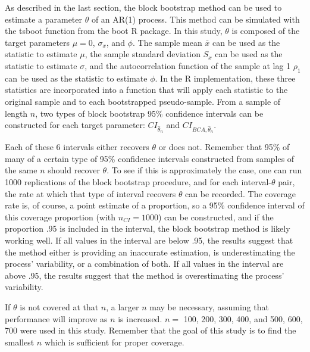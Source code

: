 \documentclass[12pt, letterpaper, titlepage]{article}
\begin{document}
As described in the last section, the block bootstrap method can be used to
estimate a parameter $\theta$ of an AR(1) process. This method can be
simulated with the tsboot function from the boot R package. In this study,
$\theta$ is composed of the target parameters $\mu = 0$, $\sigma_{x}$, and
$\phi$. The sample mean $\bar{x}$ can be used as the statistic to estimate
$\mu$, the sample standard deviation $S_x$ can be used as the statistic to
estimate $\sigma$, and the autocorrelation function of the sample at lag 1
$\rho_1$ can be used as the statistic to estimate $\phi$. In the R
implementation, these three statistics are incorporated into a function that
will apply each statistic to the original sample and to each bootstrapped
pseudo-sample. From a sample of length $n$, two types of block bootstrap 95\%
confidence intervals can be constructed for each target parameter:
$CI_{\hat{\theta}_{n}}$ and $CI_{BCA, \hat{\theta}_{n}}$.


Each of these 6 intervals either recovers $\theta$ or does not. Remember that
95\% of many of a certain type of 95\% confidence intervals constructed from
samples of the same $n$ should recover $\theta$. To see if this is
approximately the case, one can run 1000 replications of the block bootstrap
procedure, and for each interval-$\theta$ pair, the rate at which that type of
interval recovers $\theta$ can be recorded. The coverage rate is, of course, a
point estimate of a proportion, so a 95\% confidence interval of this coverage
proportion (with $n_{CI} = 1000$) can be constructed, and if the proportion
.95 is included in the interval, the block bootstrap method is likely working
well. If all values in the interval are below .95, the results suggest that the
method either is providing an inaccurate estimation, is underestimating the
process' variability, or a combination of both. If all values in the interval
are above .95, the results suggest that the method is overestimating the
process' variability.


If $\theta$ is not covered at that $n$, a larger $n$ may be
necessary, assuming that performance will improve as $n$ is increased. $n =$
100, 200, 300, 400, and 500, 600, 700 were used in this study. Remember that
the goal of this study is to find the smallest $n$ which is sufficient for
proper coverage. 
\end{document}
